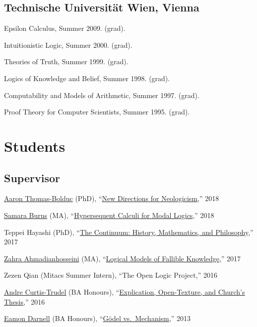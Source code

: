 \documentclass[11pt]{article}
\begin{document}
\subsection{Technische Universität Wien, Vienna}
\ind Epsilon Calculus, Summer 2009. (grad).

\ind Intuitionistic Logic, Summer 2000. (grad).

\ind Theories of Truth, Summer 1999. (grad).

\ind Logics of Knowledge and Belief, Summer 1998. (grad).

\ind Computability and Models of Arithmetic, Summer 1997. (grad).

\ind Proof Theory for Computer Scientists, Summer 1995. (grad).


\section{Students}

\subsection{Supervisor}
\ind \href{https://hcommons.org/members/arthomasbolduc/}{Aaron Thomas-Bolduc} (PhD), ``\href{https://prism.ucalgary.ca/handle/1880/107131}{New Directions for Neologicism},'' 2018

\ind \href{https://phil.ucalgary.ca/profiles/samara-burns}{Samara Burns} (MA), ``\href{https://prism.ucalgary.ca/handle/1880/106539}{Hypersequent Calculi for Modal Logics},'' 2018

\ind Teppei Hayashi (PhD), ``\href{https://prism.ucalgary.ca/handle/1880/106283}{The Continuum: History, Mathematics, and Philosophy},'' 2017

\ind \href{http://logic.berkeley.edu/students.html}{Zahra Ahmadianhosseini} (MA), ``\href{https://prism.ucalgary.ca/handle/11023/3942}{Logical Models of Fallible Knowledge},'' 2017

\ind Zezen Qian (Mitacs Summer Intern), ``The Open Logic Project,'' 2016

\ind \href{https://philosophy.osu.edu/people/curtistrudel.1}{Andre Curtis-Trudel} (BA Honours), ``\href{http://dspace.ucalgary.ca/handle/1880/51499}{Explication, Open-Texture, and Church's Thesis},'' 2016

\ind \href{https://philosophy.utoronto.ca/directory/eamon-michael-darnell/}{Eamon Darnell} (BA Honours), ``\href{http://dspace.ucalgary.ca/handle/1880/50993}{Gödel vs.~Mechanism},'' 2013
\end{document}
